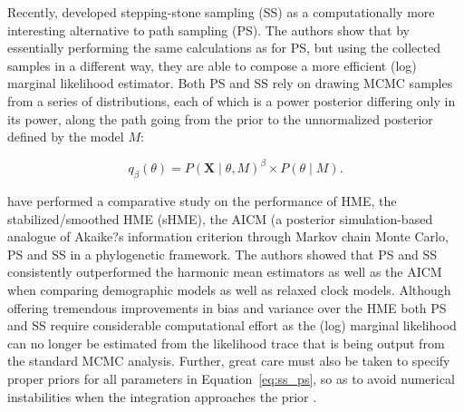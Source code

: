 Recently, \cite{Xie2011} developed stepping-stone sampling (SS) as a computationally more interesting alternative to path sampling (PS).
The authors show that by essentially performing the same calculations as for PS, but using the collected samples in a different way, they are able to compose a more efficient (log) marginal likelihood estimator.
Both PS and SS rely on drawing MCMC samples from a series of distributions, each of which is a power posterior differing only in its power, along the path going from the prior to the unnormalized posterior defined by the model $M$:  

\begin{equation}  
q_{\beta}\left(\theta\right)=P\left(\mathbf{X}\mid\theta,M\right)^{\beta} \times P\left(\theta\mid M\right).
\label{eq:ss_ps}
\end{equation}  

\cite{Baele2012} have performed a comparative study on the performance of HME, the stabilized/smoothed HME (sHME), the AICM (a posterior simulation-based analogue of Akaike?s information criterion through Markov chain Monte Carlo, PS and SS in a phylogenetic framework.
The authors showed that PS and SS consistently outperformed the harmonic mean estimators as well as the AICM when comparing demographic models as well as relaxed clock models.
Although offering tremendous improvements in bias and variance over the HME both PS and SS require considerable computational effort as the (log) marginal likelihood can no longer be estimated from the likelihood trace that is being output from the standard MCMC analysis. 
Further, great care must also be taken to specify proper priors for all parameters in Equation~\ref{eq:ss_ps}, so as to avoid numerical instabilities when the integration approaches the prior \cite{Baele2013b}.  











